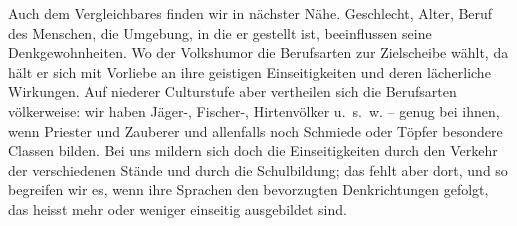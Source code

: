 Auch dem Vergleichbares finden wir in nächster Nähe. Geschlecht, Alter, Beruf des Menschen, die Umgebung, in die er gestellt ist, beeinflussen seine Denkgewohnheiten. Wo der Volkshumor die Berufsarten zur Zielscheibe wählt, da hält er sich mit Vorliebe an ihre geistigen Einseitigkeiten und deren lächerliche Wirkungen. Auf niederer Culturstufe aber vertheilen sich die Berufsarten völkerweise: wir haben Jäger-, Fischer-, Hirtenvölker u.~s.~w. – genug bei ihnen, wenn Priester und Zauberer und allenfalls noch Schmiede oder Töpfer besondere Classen bilden. Bei uns mildern sich doch die Einseitigkeiten durch den Verkehr der verschiedenen Stände und durch die Schulbildung; das fehlt aber dort, und so begreifen wir es, wenn ihre Sprachen den bevorzugten Denkrichtungen gefolgt, das heisst mehr oder weniger einseitig ausgebildet sind.

